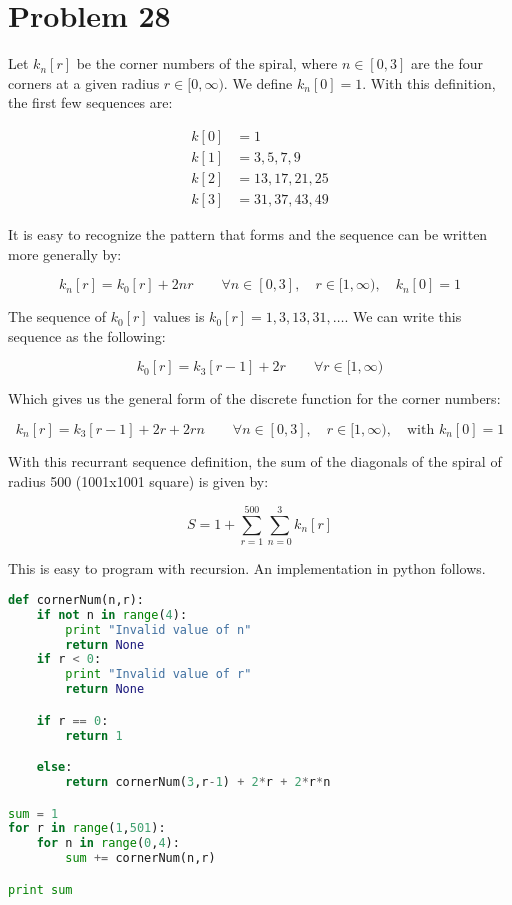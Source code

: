 \documentclass{article}
\begin{document}
	
	\section*{Problem 28}
	
	Let \(k_n[r]\) be the corner numbers of the spiral, where \(n\in[0,3]\) are the four corners at a given radius \(r\in[0,\infty)\). We define \(k_n[0] = 1\). With this definition, the first few sequences are:
	
	\begin{align*}
		k[0] &= 1\\
		k[1] &= 3,5,7,9\\
		k[2] &= 13,17,21,25\\
		k[3] &= 31,37,43,49
	\end{align*}
	
	It is easy to recognize the pattern that forms and the sequence can be written more generally by:
	
	\begin{equation}
		k_n[r] = k_0[r] + 2nr\qquad\forall n\in [0,3],\quad r\in[1,\infty),\quad k_n[0] = 1
	\end{equation}
	
	The sequence of \(k_0[r]\) values is \(k_0[r] = 1,3,13,31,\dots\). We can write this sequence as the following:
	
	\begin{equation}
		k_0[r] = k_3[r-1] + 2r \qquad\forall r\in[1,\infty)
	\end{equation}
	
	Which gives us the general form of the discrete function for the corner numbers:
	
	\begin{equation}
		k_n[r] = k_3[r-1] + 2r +2rn\qquad\forall n\in[0,3],\quad r\in[1,\infty),\quad \text{with }k_n[0] = 1
	\end{equation}
	
	With this recurrant sequence definition, the sum of the diagonals of the spiral of radius 500 (1001x1001 square) is given by:
	
	\begin{equation}
		S = 1 + \sum_{r=1}^{500}\sum_{n=0}^{3}k_n[r]
	\end{equation}
	
	This is easy to program with recursion. An implementation in python follows.
	\newpage
	\begin{lstlisting}[language=Python]
def cornerNum(n,r):
	if not n in range(4):
		print "Invalid value of n"
		return None
	if r < 0:
		print "Invalid value of r"
		return None

	if r == 0:
		return 1

	else:
		return cornerNum(3,r-1) + 2*r + 2*r*n

sum = 1
for r in range(1,501):
	for n in range(0,4):
		sum += cornerNum(n,r)

print sum
	\end{lstlisting}
	
\end{document}
